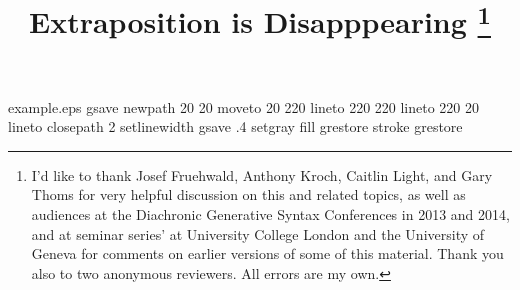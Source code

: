 %
%
%
%
%
\begin{filecontents*}{example.eps}
gsave
newpath
  20 20 moveto
  20 220 lineto
  220 220 lineto
  220 20 lineto
closepath
2 setlinewidth
gsave
  .4 setgray fill
grestore
stroke
grestore
\end{filecontents*}
%
\RequirePackage{fix-cm}
%
\documentclass{svjour3}                     %
%
\smartqed  %
%
\usepackage{mhsetup}
\usepackage{amsmath}
\usepackage{mathtools}
\usepackage{natbib}
\usepackage{graphicx}
\usepackage{float}
\usepackage{qtree}
\usepackage[utf8]{inputenc}
\usepackage{gb4e}
\usepackage[T1]{fontenc}
\usepackage{ tipa }
\usepackage{hyperref}
\newcommand{\noteme}[1]{\noindent \textbf{[[JCW:  #1 ]]}}
\renewcommand{\theequation}{\Alph{equation}}




\title{Extraposition is Disapppearing
\thanks{I'd like to thank Josef Fruehwald, Anthony Kroch, Caitlin Light, and Gary Thoms for very helpful discussion on this and related topics, as well as audiences at the Diachronic Generative Syntax Conferences in 2013 and 2014, and at seminar series' at University College London and the University of Geneva for comments on earlier versions of some of this material. Thank you also to two anonymous reviewers. All errors are my own.}}

